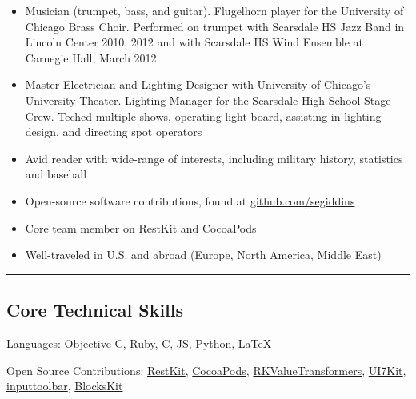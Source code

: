 \documentclass[10pt,letterpaper]{article}
\newcommand{\ahref}[1]
{\href{http://#1}{#1}}
\newcommand{\github}[2]
{\href{https://github.com/#1/#2}{#2}}
\begin{document}
\begin{itemize}[noitemsep, leftmargin=*]
    \item Musician (trumpet, bass, and guitar). Flugelhorn player for the University of Chicago Brass Choir. Performed on trumpet with Scarsdale HS Jazz Band in Lincoln Center 2010, 2012 and with Scarsdale HS Wind Ensemble at Carnegie Hall, March 2012
    \item Master Electrician and Lighting Designer with University of Chicago’s University Theater. Lighting Manager for the Scarsdale High School Stage Crew. Teched multiple shows, operating light board, assisting in lighting design, and directing spot operators
    \item Avid reader with wide-range of interests, including military history, statistics and baseball
    \item Open-source software contributions, found at \ahref{github.com/segiddins}
    \item Core team member on RestKit and CocoaPods
    \item Well-traveled in U.S. and abroad (Europe, North America, Middle East)
\end{itemize}


\hrule
\vspace{-0.4em}
\subsection*{Core Technical Skills}

\begin{description*}
	\item[Languages:]
	    Objective-C,
	    Ruby,
	    C,
	    JS,
	    Python,
	    \LaTeX
	\item[Open Source Contributions:]
	    \github{RestKit}{RestKit},
	    \github{CocoaPods}{CocoaPods},
	    \github{RestKit}{RKValueTransformers},
	    \github{youknowone}{UI7Kit},
	    \github{brandonhamilton}{inputtoolbar},
	    \github{pandamonia}{BlocksKit}
\end{description*}
\end{document}
